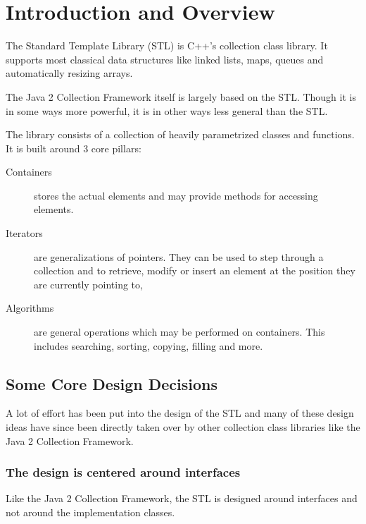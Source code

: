 \section{Introduction and Overview}

The Standard Template Library (STL) is C++'s collection class library. It
supports most classical data structures like linked lists, maps, queues
and automatically resizing arrays. 

The Java 2 Collection Framework itself is largely based on the STL. Though
it is in some ways more powerful, it is in other ways less general than 
the STL.

The library consists of a collection of heavily parametrized classes and 
functions. It is built around 3 core pillars:
\begin{description}
  \item[Containers] stores the actual elements and may provide methods
                    for accessing elements.
  \item[Iterators]  are generalizations of pointers. They can be used
                    to step through a collection and to retrieve, 
                    modify or insert an element at the position they
                    are currently pointing to,
  \item[Algorithms] are general operations which may be performed on
                    containers. This includes searching, sorting, copying,
                    filling and more.
\end{description}                                        
                   

\subsection{Some Core Design Decisions}

A lot of effort has been put into the design of the STL and many of these
design ideas have since been directly taken over by other collection class
libraries like the Java 2 Collection Framework.


\subsubsection{The design is centered around interfaces}

Like the Java 2 Collection Framework, the STL is designed around
interfaces and not around the implementation classes.


